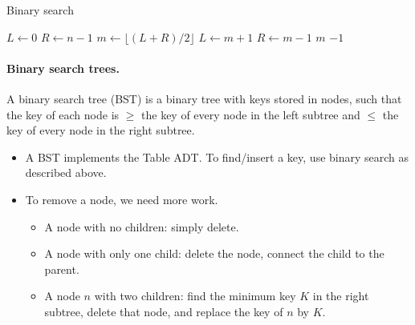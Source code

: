 \begin{algorithm}[H]
  \caption{Binary search
    \label{alg:binsearch}}
\begin{algorithmic}[1]
	\State $L \gets 0$
	\State $R \gets n-1$
		\State $m \gets \lfloor (L+R)/2\rfloor$ 
			\State $L\gets m+1$
			\State $R\gets m-1$
		\Else 
			\State \Return $m$ 
		\EndIf
	\EndWhile
	\Return $-1$ 
\EndFunction
\end{algorithmic}
\end{algorithm}

\paragraph{Binary search trees.}
\begin{Definition}
A {binary search tree} (BST) is a binary tree with keys stored in nodes, 
such that the key of each node is $\geq$ the key of every node in the left subtree and $\leq$ 
the key of  every node in the right subtree.
\end{Definition}

\begin{itemize}
\item A BST implements the Table ADT. To find/insert a key, use binary search as 
described above.
\item To remove a node, we need more work.
\begin{itemize}
\item A node with no children: simply delete.
\item A node with only one child: delete the node, connect the child 
to the parent.
\item A node $n$ with two children: find the minimum key $K$ in the 
right subtree, delete that node, and replace the key of $n$ by $K$.
\end{itemize}
\end{itemize}


